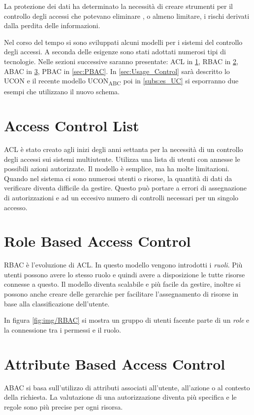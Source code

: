 \label{chap:Access Control e Usage Control}
La protezione dei dati ha determinato la necessità di creare strumenti per il controllo degli accessi che potevano eliminare
, o almeno limitare, i rischi derivati dalla perdita delle informazioni.\par
Nel corso del tempo si sono sviluppati alcuni modelli per i sistemi del controllo degli accessi. A seconda delle esigenze
sono stati adottati numerosi tipi di tecnologie\cite{NISTACM}. Nelle sezioni successive saranno presentate:
\ac{ACL} in \ref{sec:ACL}, \ac{RBAC} in \ref{sec:RBAC}, \ac{ABAC} in \ref{sec:ABAC}, \ac{PBAC} in \ref{sec:PBAC}.
In \ref{sec:Usage_Control} sarà descritto lo \ac{UCON} e il recente modello UCON\textsubscript{ABC} poi in \ref{subs:es_UC}
si esporranno due esempi che utilizzano il nuovo schema.
\section{Access Control List}
\label{sec:ACL}
\ac{ACL} è stato creato agli inizi degli anni settanta per la necessità di un controllo degli
accessi sui sistemi multiutente.
Utilizza una lista di utenti con annesse le possibili azioni autorizzate. Il modello è semplice,
ma ha molte limitazioni. Quando nel sistema ci sono numerosi utenti o risorse, la quantità di dati da verificare diventa
difficile da gestire. Questo può portare a errori di assegnazione di autorizzazioni e ad un eccesivo numero di controlli
necessari per un singolo accesso.
\section{Role Based Access Control}
\label{sec:RBAC}
\ac{RBAC} è l'evoluzione di \ac{ACL}. In questo modello vengono introdotti i \emph{ruoli}. Più utenti
possono avere lo stesso ruolo e quindi avere a disposizione le tutte risorse connesse a questo. Il modello
diventa scalabile e più facile da gestire, inoltre si possono anche creare delle gerarchie per facilitare l'assegnamento di
risorse in base alla classificazione dell'utente. \par In figura \ref{fig:img/RBAC} si mostra un gruppo di utenti
facente parte di un \emph{role} e la connessione tra i permessi e il ruolo.
\section{Attribute Based Access Control}
\label{sec:ABAC}
\ac{ABAC} si basa sull'utilizzo di attributi associati all'utente, all'azione o al contesto
della richiesta. La valutazione di una autorizzazione diventa più specifica e le regole sono più precise per ogni risorsa.

